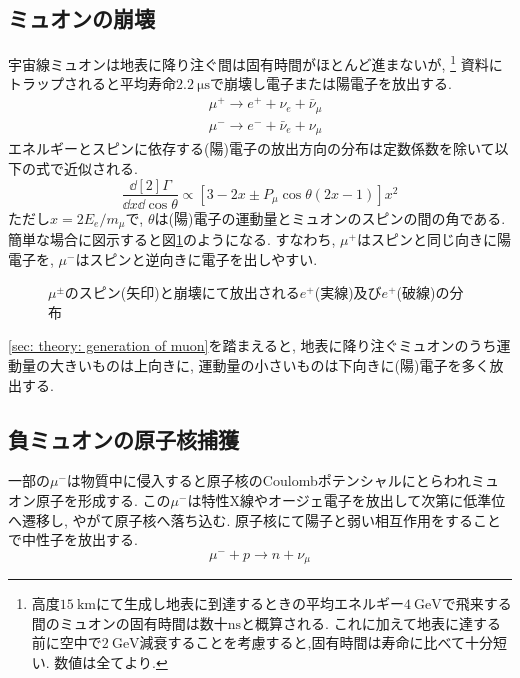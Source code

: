 \documentclass[dvipdfmx]{jsarticle}
\begin{document}
\subsection{ミュオンの崩壊}
\label{sec: theory: decay of muon}

宇宙線ミュオンは地表に降り注ぐ間は固有時間がほとんど進まないが,
\footnote{
    高度$\SI{15}{\km}$にて生成し地表に到達するときの平均エネルギー$\SI{4}{\GeV}$で飛来する間のミュオンの固有時間は数十$\si{\ns}$と概算される.
    これに加えて地表に達する前に空中で$\SI{2}{\GeV}$減衰することを考慮すると,固有時間は寿命に比べて十分短い.
    数値は全て\cite{PDG}より.
}
資料にトラップされると平均寿命$\SI{2.2}{\micro\second}$で崩壊し電子または陽電子を放出する.
\begin{align*}
    &\mu^+\to e^++\nu_e+\bar{\nu}_\mu
    \\
    &\mu^-\to e^-+\bar{\nu}_e+\nu_\mu
\end{align*}
エネルギーとスピンに依存する(陽)電子の放出方向の分布は定数係数を除いて以下の式で近似される\cite{PDG}.
\begin{equation*}
    \frac{\dd[2]{\Gamma}}{\dd{x}\dd{\cos\theta}}
    \propto
    [3-2x\pm P_\mu\cos\theta(2x-1)]x^2
\end{equation*}
ただし$x=2E_e/m_\mu$で, $\theta$は(陽)電子の運動量とミュオンのスピンの間の角である.
簡単な場合に図示すると図\ref{fig: muon decay distrib.}のようになる.
すなわち, $\mu^+$はスピンと同じ向きに陽電子を, $\mu^-$はスピンと逆向きに電子を出しやすい.

\begin{figure}
    \centering
    
    \caption{$\mu^\pm$のスピン(矢印)と崩壊にて放出される$e^+$(実線)及び$e^+$(破線)の分布}
    \label{fig: muon decay distrib.}
\end{figure}

\ref{sec: theory: generation of muon}を踏まえると, 地表に降り注ぐミュオンのうち運動量の大きいものは上向きに, 運動量の小さいものは下向きに(陽)電子を多く放出する.


\subsection{負ミュオンの原子核捕獲}
\label{sec: theory: negative muon capture}

一部の$\mu^-$は物質中に侵入すると原子核のCoulombポテンシャルにとらわれミュオン原子を形成する.
この$\mu^-$は特性X線やオージェ電子を放出して次第に低準位へ遷移し, やがて原子核へ落ち込む.
原子核にて陽子と弱い相互作用をすることで中性子を放出する.
\begin{equation*}
    \mu^-+p\to n+\nu_\mu
\end{equation*}
\end{document}
